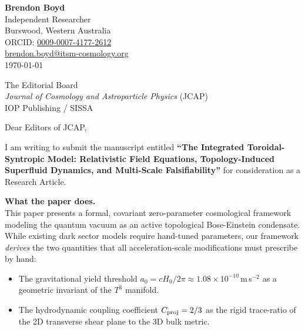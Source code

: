 \documentclass[10pt, a4paper]{article}
\begin{document}
\thispagestyle{empty}

\begin{flushright}
\textbf{Brendon Boyd} \\
Independent Researcher \\
Burswood, Western Australia \\
ORCID: \href{https://orcid.org/0009-0007-4177-2612}{0009-0007-4177-2612} \\
\href{mailto:brendon.boyd@itsm-cosmology.org}{brendon.boyd@itsm-cosmology.org} \\
\vspace{0.5em}
\today
\end{flushright}

\vspace{1em}
\noindent The Editorial Board \\
\textit{Journal of Cosmology and Astroparticle Physics} (JCAP) \\
IOP Publishing / SISSA

\vspace{1em}
\noindent Dear Editors of JCAP,

\vspace{0.5em}
I am writing to submit the manuscript entitled \textbf{``The Integrated Toroidal-Syntropic Model: Relativistic Field Equations, Topology-Induced Superfluid Dynamics, and Multi-Scale Falsifiability''} for consideration as a Research Article.

\vspace{0.4em}
\noindent\textbf{What the paper does.} \\
This paper presents a formal, covariant zero-parameter cosmological framework modeling the quantum vacuum as an active topological Bose-Einstein condensate. While existing dark sector models require hand-tuned parameters, our framework \emph{derives} the two quantities that all acceleration-scale modifications must prescribe by hand:
\begin{itemize}[noitemsep,topsep=0pt,parsep=0pt,partopsep=0pt]
  \item The gravitational yield threshold $a_0 = cH_0/2\pi \approx 1.08\times10^{-10}$\,m\,s$^{-2}$ as a geometric invariant of the $T^3$ manifold.
  \item The hydrodynamic coupling coefficient $C_{\rm proj} = 2/3$ as the rigid trace-ratio of the 2D transverse shear plane to the 3D bulk metric.
\end{itemize}
\end{document}
